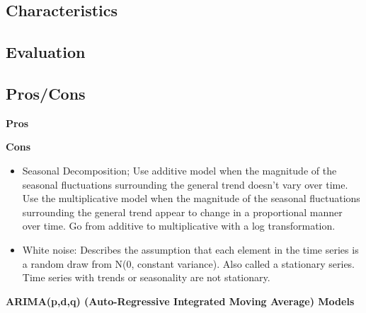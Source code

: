 \documentclass[]{book}
\begin{document}
\subsection{Characteristics}\label{characteristics-12}

\subsection{Evaluation}\label{evaluation-13}

\subsection{Pros/Cons}\label{proscons-13}

\textbf{Pros}

\textbf{Cons}

\begin{itemize}
\item
  Seasonal Decomposition; Use additive model when the magnitude of the
  seasonal fluctuations surrounding the general trend doesn't vary over
  time. Use the multiplicative model when the magnitude of the seasonal
  fluctuations surrounding the general trend appear to change in a
  proportional manner over time. Go from additive to multiplicative with
  a log transformation.
\item
  White noise: Describes the assumption that each element in the time
  series is a random draw from N(0, constant variance). Also called a
  stationary series. Time series with trends or seasonality are not
  stationary.
\end{itemize}

\textbf{ARIMA(p,d,q) (Auto-Regressive Integrated Moving Average) Models}
\end{document}
